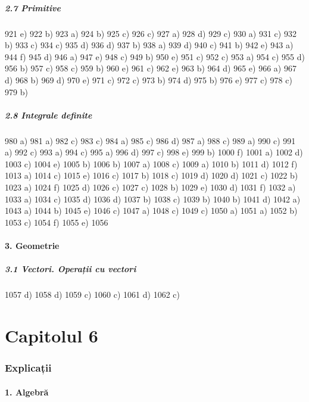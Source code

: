 \documentclass[11pt]{article}
\begin{document}
\subsubsection*{2.7 Primitive}
921 e) 922 b) 923 a) 924 b) 925 c) 926 c) 927 a) 928 d) 929 c) 930 a) 931 c) 932 b) 933 c) 934 c) 935 d) 936 d) 937 b) 938 a) 939 d) 940 c) 941 b) 942 e) 943 a) 944 f) 945 d) 946 a) 947 e) 948 c) 949 b) 950 e) 951 c) 952 c) 953 a) 954 c) 955 d) 956 b) 957 c) 958 c) 959 b) 960 e) 961 c) 962 e) 963 b) 964 d) 965 e) 966 a) 967 d) 968 b) 969 d) 970 e) 971 c) 972 c) 973 b) 974 d) 975 b) 976 e) 977 c) 978 c) 979 b)

\subsubsection*{2.8 Integrale definite}
980 a) 981 a) 982 c) 983 c) 984 a) 985 c) 986 d) 987 a) 988 c) 989 a) 990 c) 991 a) 992 c) 993 a) 994 c) 995 a) 996 d) 997 c) 998 e) 999 b) 1000 f) 1001 a) 1002 d) 1003 c) 1004 e) 1005 b) 1006 b) 1007 a) 1008 c) 1009 a) 1010 b) 1011 d) 1012 f) 1013 a) 1014 c) 1015 e) 1016 c) 1017 b) 1018 c) 1019 d) 1020 d) 1021 c) 1022 b) 1023 a) 1024 f) 1025 d) 1026 c) 1027 c) 1028 b) 1029 e) 1030 d) 1031 f) 1032 a) 1033 a) 1034 c) 1035 d) 1036 d) 1037 b) 1038 c) 1039 b) 1040 b) 1041 d) 1042 a) 1043 a) 1044 b) 1045 e) 1046 c) 1047 a) 1048 c) 1049 c) 1050 a) 1051 a) 1052 b) 1053 c) 1054 f) 1055 e) 1056

\subsection*{3. Geometrie}
\subsubsection*{3.1 Vectori. Operații cu vectori}
1057 d) 1058 d) 1059 c) 1060 c) 1061 d) 1062 c)

\part*{Capitolul 6}
\section*{Explicații}
\subsection*{1. Algebră}
\end{document}
